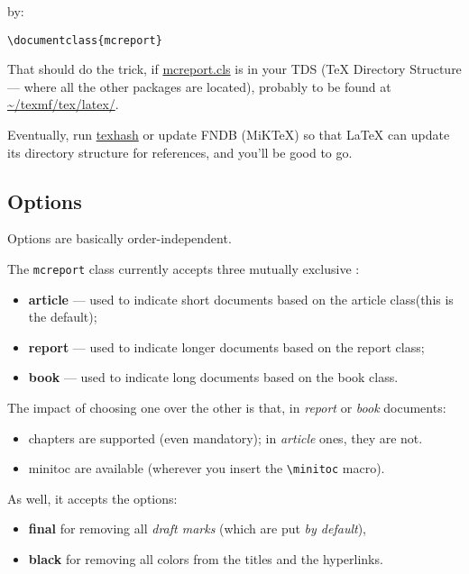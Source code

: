 \documentclass{mcreport}
\begin{document}
by:

\begin{verbatim}
\documentclass{mcreport}
\end{verbatim}

That should do the trick, if \url{mcreport.cls} is in your \acs{TDS} (\TeX{}
Directory Structure --- where all the other packages are located), probably
to be found at \url{~/texmf/tex/latex/}.

Eventually, run \url{texhash} or update FNDB (MiKTeX) so that \LaTeX{} can
update its directory structure for references, and you'll be good to go.

\subsection{Options}
\label{sec:options}

Options are basically order-independent.

The \texttt{mcreport} class currently accepts three mutually exclusive
:

\begin{itemize}
    \item \textbf{article} --- used to indicate short documents based on the
    \textsf{article} class(this is the default);
    \item \textbf{report} --- used to indicate longer documents based on the
    \textsf{report} class;
    \item \textbf{book} --- used to indicate long documents based on the
    \textsf{book} class.
\end{itemize}

The impact of choosing one over the other is that, in \emph{report} or
\emph{book} documents:

\begin{itemize}
    \item chapters are supported (even mandatory); in \emph{article} ones,
    they are not.
    \item minitoc are available (wherever you insert the \verb|\minitoc|
    macro).
\end{itemize}

As well, it accepts the options:

\begin{itemize}
    \item \textbf{final} for removing all \textit{draft marks} (which are put
    \emph{by default}),
    \item \textbf{black} for removing all colors from the titles and the
    hyperlinks.
\end{itemize}
\end{document}
